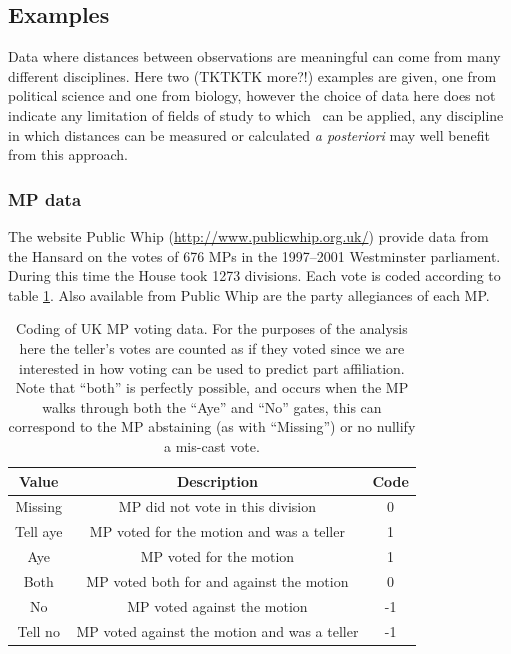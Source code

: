 \subsection{Examples}

Data where distances between observations are meaningful can come from many different disciplines. Here two (TKTKTK more?!) examples are given, one from political science and one from biology, however the choice of data here does not indicate any limitation of fields of study to which \mdsds\ can be applied, any discipline in which distances can be measured or calculated \textit{a posteriori} may well benefit from this approach.


\subsubsection{MP data}


The website Public Whip (\url{http://www.publicwhip.org.uk/}) provide data from the Hansard on the votes of 676 MPs in the 1997--2001 Westminster parliament. During this time the House took 1273 divisions. Each vote is coded according to table \ref{voting-code}. Also available from Public Whip are the party allegiances of each MP. 

\begin{table}  
\begin{centering}
\begin{tabular}{ccc}
    Value & Description & Code \\ 
    \hline
    Missing & MP did not vote in this division & 0 \\ 
    Tell aye & MP voted for the motion and was a teller & 1 \\ 
    Aye & MP voted for the motion & 1 \\ 
    Both & MP voted both for  and against the motion & 0 \\ 
    No & MP voted against the motion & -1 \\ 
    Tell no & MP voted against the motion and was a teller & -1 \\ 
  \end{tabular}
\caption{Coding of UK MP voting data. For the purposes of the analysis here the teller's votes are counted as if they voted since we are interested in how voting can be used to predict part affiliation. Note that ``both'' is perfectly possible, and occurs when the MP walks through both the ``Aye'' and ``No'' gates, this can correspond to the MP abstaining (as with ``Missing'') or no nullify a mis-cast vote.}
\end{centering}
\label{voting-code}
\end{table}

